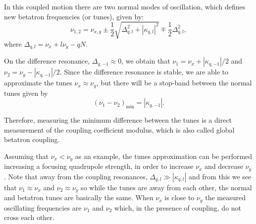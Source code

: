 In this coupled motion there are two normal modes of oscillation, which defines new betatron frequencies (or tunes), given by:
\begin{equation}
    \nu_{1, 2} = \nu_{x, y} \pm \dfrac{1}{2}\sqrt{\Delta_{q, l}^2 + |\kappa_{q, l}|^2} \mp \dfrac{1}{2}\Delta_{q, l}^2,
\end{equation}
where $\Delta_{q, l} = \nu_x + l\nu_y - q N$. 

On the difference resonance, $\Delta_{q, -1} \approx 0$, we obtain that $\nu_1 = \nu_x + |\kappa_{q, -1}|/2$ and $\nu_2 = \nu_y - |\kappa_{q, -1}|/2$. Since the difference resonance is stable, we are able to approximate the tunes $\nu_x \approx \nu_y$, but there will be a stop-band between the normal tunes given by
\begin{equation}
\left(\nu_1 - \nu_2\right)_{\mathrm{min}} = |\kappa_{q, -1}|.
\end{equation}

Therefore, measuring the minimum difference between the tunes is a direct measurement of the coupling coefficient modulus, which is also called global betatron coupling. 

Assuming that $\nu_x < \nu_y$ as an example, the tunes approximation can be performed increasing a focusing quadrupole strength, in order to increase $\nu_x$ and decrease $\nu_y$. Note that away from the coupling resonances, $\Delta_{q, l} \gg |\kappa_{q, l}|$ and from this we see that $\nu_1 \approx \nu_x$ and $\nu_2 \approx \nu_y$ so while the tunes are away from each other, the normal and betatron tunes are basically the same. When $\nu_x$ is close to $\nu_y$ the measured oscillating frequencies are $\nu_1$ and $\nu_2$ which, in the presence of coupling, do not cross each other.








